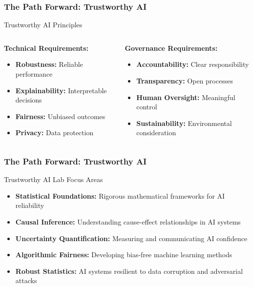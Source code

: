 \documentclass{beamer}
\begin{document}
\begin{frame}
    \frametitle{The Path Forward: Trustworthy AI}
    \begin{block}{Trustworthy AI Principles}
        \begin{columns}
            \begin{column}{0.48\textwidth}
                \textbf{Technical Requirements:}
                \begin{itemize}
                    \item \textbf{Robustness:} Reliable performance
                    \item \textbf{Explainability:} Interpretable decisions
                    \item \textbf{Fairness:} Unbiased outcomes
                    \item \textbf{Privacy:} Data protection
                \end{itemize}
            \end{column}
            \begin{column}{0.48\textwidth}
                \textbf{Governance Requirements:}
                \begin{itemize}
                    \item \textbf{Accountability:} Clear responsibility
                    \item \textbf{Transparency:} Open processes
                    \item \textbf{Human Oversight:} Meaningful control
                    \item \textbf{Sustainability:} Environmental consideration
                \end{itemize}
            \end{column}
        \end{columns}
    \end{block}

\end{frame}

\begin{frame}
    \frametitle{The Path Forward: Trustworthy AI}

    \begin{alertblock}{Trustworthy AI Lab Focus Areas}
        \begin{itemize}
            \item \textbf{Statistical Foundations:} Rigorous mathematical frameworks for AI reliability
            \item \textbf{Causal Inference:} Understanding cause-effect relationships in AI systems
            \item \textbf{Uncertainty Quantification:} Measuring and communicating AI confidence
            \item \textbf{Algorithmic Fairness:} Developing bias-free machine learning methods
            \item \textbf{Robust Statistics:} AI systems resilient to data corruption and adversarial attacks
        \end{itemize}
    \end{alertblock}
    
\end{frame}
\end{document}
